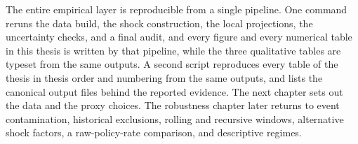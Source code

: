 The entire empirical layer is reproducible from a single pipeline. One command reruns the data build, the shock construction, the local projections, the uncertainty checks, and a final audit, and every figure and every numerical table in this thesis is written by that pipeline, while the three qualitative tables are typeset from the same outputs. A second script reproduces every table of the thesis in thesis order and numbering from the same outputs, and  lists the canonical output files behind the reported evidence. The next chapter sets out the data and the proxy choices. The robustness chapter later returns to event contamination, historical exclusions, rolling and recursive windows, alternative shock factors, a raw-policy-rate comparison, and descriptive regimes.
